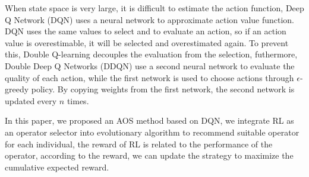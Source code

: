 \documentclass[journal]{IEEEtran}
\begin{document}
When state space is very large, it is difficult to estimate the action function, Deep Q Network (DQN) \cite{mnih2015human} uses a neural network to approximate action value function.
DQN uses the same values to select and to evaluate an action, so if an action value is overestimable, it will be selected and overestimated again. To prevent this, Double Q-learning \cite{hasselt2010double} decouples the evaluation from the selection,
futhermore, Double Deep Q Networks (DDQN) \cite{ddqn} use a second neural network to evaluate the quality of each action, while the first network is used to choose actions through $\epsilon$-greedy policy.
By copying weights from the first network, the second network is updated every $n$ times.

In this paper, we proposed an AOS method based on DQN,
we integrate RL as an operator selector into evolutionary algorithm to recommend suitable operator for each individual, the reward of RL is related to the performance of the operator, according to the reward, we can update the strategy to maximize the cumulative expected reward.

\end{document}
